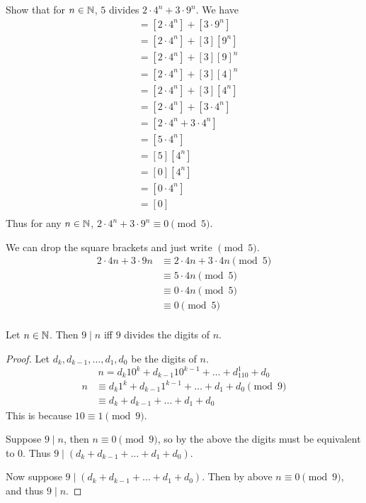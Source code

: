 \documentclass{article}
\begin{document}
  \begin{example}
    Show that for $n \in \mathbb{N}$, $5$ divides $2 \cdot 4^n + 3 \cdot 9^n$.
    We have
    \begin{align*}
      [2 \cdot 4^n + 3 \cdot 9^n] &=  [2 \cdot 4^n] + [3 \cdot 9^n]\\
      &= [2 \cdot 4^n] + [3][9^n]\\
      &= [2 \cdot 4^n] + [3][9]^n\\
      &= [2 \cdot 4^n] + [3][4]^n\\
      &= [2 \cdot 4^n] + [3][4^n]\\
      &= [2 \cdot 4^n] + [3 \cdot 4^n]\\
      &= [2 \cdot 4^n + 3 \cdot 4^n]\\
      &= [5 \cdot 4^n]\\
      &= [5][4^n]\\
      &= [0][4^n]\\
      &= [0 \cdot 4^n]\\
      &= [0]\\
    \end{align*}
    Thus for any $n \in \mathbb{N}$, $2 \cdot 4^n + 3 \cdot 9^n \equiv 0 \pmod{5}$.

    We can drop the square brackets and just write $\pmod{5}$.
    \begin{align*}
      2 \cdot 4n + 3 \cdot 9n &\equiv 2 \cdot 4n + 3 \cdot 4n \pmod{5}\\
      &\equiv 5 \cdot 4n \pmod{5}\\
      &\equiv 0 \cdot 4n \pmod{5}\\
      &\equiv 0 \pmod{5}\\
    \end{align*}
  \end{example}
  \begin{proposition}
    Let $n \in \mathbb{N}$. Then $9 \mid n$ iff $9$ divides the digits of $n$.
  \end{proposition}
  \begin{proof}
    Let $d_k, d_{k-1}, \ldots, d_1, d_0$ be the digits of $n$.
    \[
      n = d_k10^k + d_{k-1}10^{k-1} + \dots + d_110^1 +d_0
    \]
    \begin{align*}
      n &\equiv d_k1^k + d_{k-1}1^{k-1} + \dots + d_1 + d_0 \pmod{9}\\
      &\equiv d_k + d_{k-1} + \dots + d_1 + d_0
    \end{align*}
    This is because $10 \equiv 1 \pmod{9}$.

    Suppose $9 \mid n$, then $n \equiv 0 \pmod{9}$, so by the above the digits must be equivalent to $0$.
    Thus $9 \mid (d_k + d_{k-1} + \dots + d_1 + d_0)$.

    Now suppose $9 \mid (d_k + d_{k-1} + \dots + d_1 + d_0)$. Then by above $n \equiv 0 \pmod{9}$, and thus $9 \mid n$.
  \end{proof}
\end{document}
